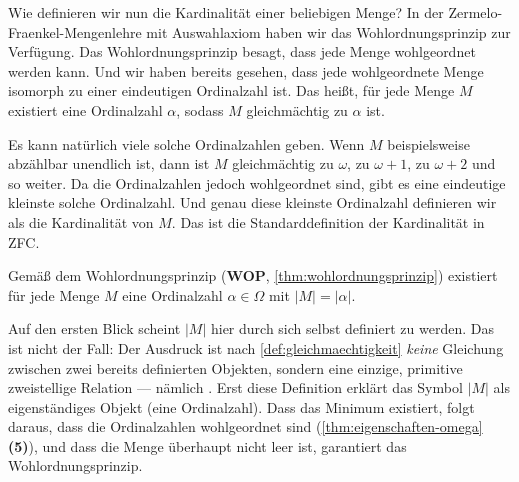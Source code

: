 \begin{spoken-clean}[00:55:45 - 00:57:32]
Wie definieren wir nun die Kardinalität einer beliebigen Menge? In der Zermelo-Fraenkel-Mengenlehre mit Auswahlaxiom haben wir das Wohlordnungsprinzip zur Verfügung. Das Wohlordnungsprinzip besagt, dass jede Menge wohlgeordnet werden kann. Und wir haben bereits gesehen, dass jede wohlgeordnete Menge isomorph zu einer eindeutigen Ordinalzahl ist. Das heißt, für jede Menge $M$ existiert eine Ordinalzahl $\alpha$, sodass $M$ gleichmächtig zu $\alpha$ ist.

Es kann natürlich viele solche Ordinalzahlen geben. Wenn $M$ beispielsweise abzählbar unendlich ist, dann ist $M$ gleichmächtig zu $\omega$, zu $\omega + 1$, zu $\omega + 2$ und so weiter. Da die Ordinalzahlen jedoch wohlgeordnet sind, gibt es eine eindeutige kleinste solche Ordinalzahl. Und genau diese kleinste Ordinalzahl definieren wir als die Kardinalität von $M$. Das ist die Standarddefinition der Kardinalität in ZFC.
\end{spoken-clean}

\begin{math-stroke}
Gemäß dem Wohlordnungsprinzip (\textbf{WOP}, \cref{thm:wohlordnungsprinzip}) existiert für jede Menge $M$ eine Ordinalzahl $\alpha \in \Omega$ mit $|M| = |\alpha|$.


\begin{explanation-of-steps}
Auf den ersten Blick scheint $|M|$ hier durch sich selbst definiert zu werden. Das ist nicht der Fall: Der Ausdruck  ist nach \cref{def:gleichmaechtigkeit} \emph{keine} Gleichung zwischen zwei bereits definierten Objekten, sondern eine einzige, primitive zweistellige Relation --- nämlich . Erst diese Definition erklärt das Symbol $|M|$ als eigenständiges Objekt (eine Ordinalzahl). Dass das Minimum existiert, folgt daraus, dass die Ordinalzahlen wohlgeordnet sind (\cref{thm:eigenschaften-omega} \textbf{(5)}), und dass die Menge überhaupt nicht leer ist, garantiert das Wohlordnungsprinzip.
\end{explanation-of-steps}
\end{math-stroke}

